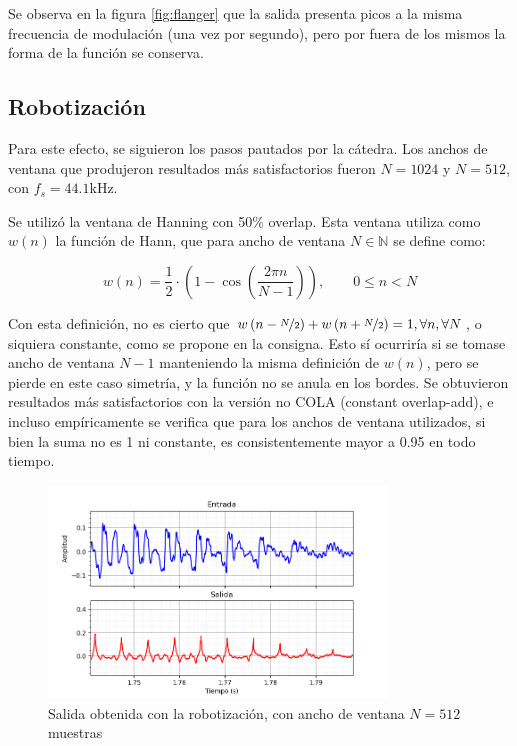\documentclass[assd_tp2_main.tex]{subfiles}
\begin{document}
Se observa en la figura \ref{fig:flanger} que la salida presenta picos a la misma frecuencia de modulaci\'on (una vez por segundo), pero por fuera de los mismos la forma de la funci\'on se conserva.


\subsection{Robotizaci\'on}

Para este efecto, se siguieron los pasos pautados por la c\'atedra. Los anchos de ventana que produjeron resultados m\'as satisfactorios fueron $N=1024$ y $N=512$, con $f_s = 44.1$kHz.

Se utiliz\'o la ventana de Hanning con 50\% overlap. Esta ventana utiliza como $w(n)$ la funci\'on de Hann, que para ancho de ventana $N\in \mathbb{N}$ se define como:

\begin{equation}
	w(n) = \frac{1}{2} \cdot 
	\left( 1 - \cos{ \left( \frac{2\pi n}{N-1} \right) } \right),
	\qquad 0 \leq n < N
\end{equation}

Con esta definici\'on, no es cierto que $w\left(n-\nicefrac{N}{2}\right) + w\left(n+\nicefrac{N}{2}\right) = 1, \forall n, \forall N$, o siquiera constante, como se propone en la consigna. Esto s\'i ocurrir\'ia si se tomase ancho de ventana $N-1$ manteniendo la misma definici\'on de $w(n)$, pero se pierde en este caso simetr\'ia, y la funci\'on no se anula en los bordes. Se obtuvieron resultados m\'as satisfactorios con la versi\'on no COLA (constant overlap-add), e incluso emp\'iricamente se verifica que para los anchos de ventana utilizados, si bien la suma no es 1 ni constante, es consistentemente mayor a 0.95 en todo tiempo.

\begin{figure}[htb]	
	\centering
	\includegraphics[width=0.8\textwidth]
	{graficos/EJ8/rochi/robotizacion_512.png}
	\caption{Salida obtenida con la robotizaci\'on, con ancho de ventana $N=512$ muestras}
	\label{fig:robot512}
\end{figure}
\end{document}
